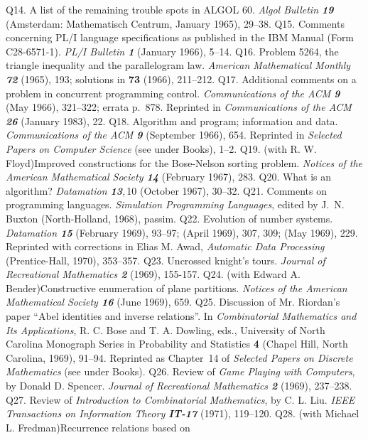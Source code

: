 \p Q14.  A list of the remaining trouble spots in ALGOL 60.  {\sl Algol
 Bulletin\/ \bf 19} (Amsterdam: Mathematisch Centrum, January 1965), 29--38. 
\p Q15.  Comments concerning PL/I language specifications as published
 in the IBM Manual (Form C28-6571-1).  {\sl PL/I Bulletin\/ \bf 1}
 (January 1966), 5--14.  
\p Q16.  Problem 5264, the triangle inequality and the parallelogram
 law.  {\sl American Mathematical Monthly\/ \bf 72} (1965), 193;
 solutions in {\bf 73} (1966), 211--212.
\p Q17.  Additional comments on a problem in concurrent programming control.
 {\sl Commun\-i\-ca\-tions of the ACM\/ \bf 9} (May 1966), 321--322;
 errata p.\ 878.  Reprinted in
 {\sl Commun\-i\-ca\-tions of the ACM\/ \bf 26} (January 1983), 22.
\p Q18.  Algorithm and program; information and data. 
 {\sl Commun\-i\-ca\-tions of the ACM\/ \bf 9} (September 1966), 654.  
 Reprinted in {\sl Selected Papers on Computer Science\/}
 (see under Books), 1--2.
\p Q19.  (with R. W. Floyd)\xskip  Improved constructions for the
 Bose-Nelson sorting problem.  {\sl Notices of the American
 Mathematical Society\/ \bf 14} (February 1967), 283.  
\p Q20.  What is an algorithm?  {\sl Datamation\/ \bf 13},\,10
 (October 1967), 30--32.  
\p Q21. Comments on programming languages. {\sl Simulation Programming
 Languages}, edited by J.~N. Buxton (North-Holland, 1968), passim.
\p Q22.  Evolution of number systems.  {\sl Datamation\/ \bf 15}
 (February 1969), 93--97; (April 1969), 307, 309; (May 1969), 229. 
 Reprinted with corrections in Elias M. Awad,
 {\sl Automatic Data Processing} (Prentice-Hall, 1970), 353--357.  
\p Q23.  Uncrossed knight's tours.  {\sl Journal of Recreational
 Mathematics\/ \bf 2} (1969), 155-157.
\p Q24.  (with Edward A. Bender)\xskip  Constructive enumeration of plane 
 partitions.  {\sl Notices of the American Mathematical Society\/ \bf 16}
 (June 1969), 659.  
\p Q25.  Discussion of Mr. Riordan's paper ``Abel identities and inverse 
 relations''.  In {\sl Combinatorial Mathematics and Its Applications}, 
 R. C. Bose and T. A. Dowling, eds., University of North Carolina Monograph
 Series in Probability and Statistics {\bf 4} (Chapel Hill, North Carolina,
 1969), 91--94.
 Reprinted as Chapter~14 of {\sl Selected Papers on
 Discrete Mathematics\/} (see under Books).
\p Q26.  Review of {\sl Game Playing with Computers}, by Donald D. Spencer.
 {\sl Journal of Recreational Mathematics\/ \bf 2} (1969), 237--238.  
\p Q27.  Review of {\sl Introduction to Combinatorial Mathematics},
 by C. L. Liu.  {\sl IEEE Transactions on Information Theory\/ \bf IT-17}
 (1971), 119--120.  
\p Q28.  (with Michael L. Fredman)\xskip  Recurrence relations based on
